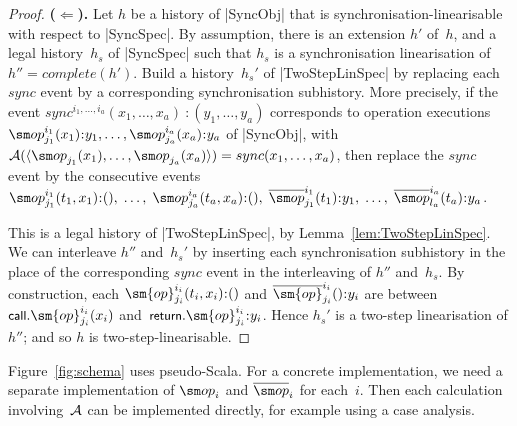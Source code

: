 \begin{proof}
\textbf{($\Leftarrow$).}\quad
%
Let $h$ be a history of |SyncObj| that is synchronisation-linearisable with
respect to |SyncSpec|.  By assumption, there is an extension $h'$ of~$h$, and
a legal history~$h_s$ of |SyncSpec| such that $h_s$ is a synchronisation
linearisation of $h'' = complete(h')$.
%
Build a history~$h_s'$ of |TwoStepLinSpec| by replacing each  $sync$
event by a corresponding synchronisation subhistory.  More precisely, if the
event $sync^{i_1,\ldots,i_a}(x_1,\ldots,x_a) \:: (y_1,\ldots,y_a)$
corresponds to operation executions 
\(  \op_{j_1}^{i_1}(x_1)\::y_1, \ldots, \op_{j_a}^{i_a}(x_a)\::y_a \)
%
of |SyncObj|, 
with $\A(\seq{\op_{j_1}(x_1), \ldots, \op_{j_a}(x_a)}) = sync(x_1,\ldots,x_a)$,
then replace the $sync$ event by the consecutive events
%
\(  \op^{i_1}_{j_1}(t_1, x_1)\::(),\linebreak[1]\; \ldots,\; \op^{i_a}_{j_a}(t_a, x_a)\::(),\;
  \overline{\op}^{i_1}_{j_1}(t_1)\::y_1,\; \ldots,\;
  \overline\op^{i_a}_{l_a}(t_a)\::y_a  \).

This is a legal history of |TwoStepLinSpec|, by
Lemma~\ref{lem:TwoStepLinSpec}.  We can interleave $h''$ and~$h_s'$ by
inserting each synchronisation subhistory in the place of the corresponding
$sync$ event in the interleaving of $h''$ and~$h_s$.  By construction, each
$\sm{op}_{j_i}^{i_i}(t_i,x_i) \:: ()$ and $\overline{\sm{op}}_{j_i}^{i_i}()
\:: y_i$ are between $\call.\sm{op}_{j_i}^{i_i}(x_i)$
and~$\return.\sm{op}_{j_i}^{i_i} \:: y_i$.
%
Hence $h_s'$ is a two-step linearisation of $h''$; and so $h$ is
two-step-linearisable.
\end{proof}


Figure~\ref{fig:schema} uses pseudo-Scala.  For a concrete implementation, we
need a separate implementation of $\op_i$ and $\overline\op_i$ for each~$i$.
Then each calculation involving~$\mathcal{A}$ can be implemented directly, for example
using a case analysis.
